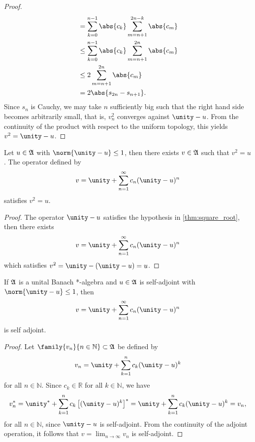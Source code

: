 \begin{proof}
\begin{align*}
                                    &= \sum_{k = 0}^{n-1} \abs{c_k} \sum_{m = n+1}^{2n - k} \abs{c_m}\\
                                    &\leq \sum_{k = 0}^{n-1} \abs{c_k} \sum_{m = n+1}^{2n} \abs{c_m}\\
                                    &\leq 2 \sum_{m = n+1}^{2n} \abs{c_m}\\
                                    &= 2 \abs{s_{2n} - s_{n+1}}.
    \end{align*}
    Since \(s_n\) is Cauchy, we may take \(n\) sufficiently big such that the right hand side becomes arbitrarily small, that is, \(v_n^2\) converges against \(\unity - u\). From the continuity of the product with respect to the uniform topology, this yields \(v^2 = \unity - u\).
\end{proof}
\begin{corollary}
    Let \(u \in \mathfrak{A}\) with \(\norm{\unity - u} \leq 1\), then there exists \(v \in \mathfrak{A}\) such that \(v^2 = u\). The operator defined by
    \begin{equation*}
        v = \unity + \sum_{n=1}^\infty c_n (\unity - u)^n
    \end{equation*}
    satisfies \(v^2 = u\).
\end{corollary}
\begin{proof}
    The operator \(\unity - u\) satisfies the hypothesis in \cref{thm:square_root}, then there exists
    \begin{equation*}
        v = \unity + \sum_{n = 1}^\infty c_n (\unity - u)^n
    \end{equation*}
    which satisfies \(v^2 = \unity - (\unity - u) = u\).
\end{proof}
\begin{corollary}
    If \(\mathfrak{A}\) is a unital Banach *-algebra and \(u \in \mathfrak{A}\) is self-adjoint with \(\norm{\unity - u} \leq 1\), then
    \begin{equation*}
        v = \unity + \sum_{n = 1}^{\infty}c_n(\unity - u)^n
    \end{equation*}
    is self adjoint.
\end{corollary}
\begin{proof}
    Let \(\family{v_n}{n \in \mathbb{N}} \subset \algebra{A}\) be defined by
    \begin{equation*}
        v_n = \unity + \sum_{k = 1}^n c_k (\unity - u)^k
    \end{equation*}
    for all \(n \in \mathbb{N}\). Since \(c_k \in \mathbb{R}\) for all \(k \in \mathbb{N}\), we have
    \begin{equation*}
        v_n^* = \unity^* + \sum_{k=1}^n c_k\left[(\unity - u)^k\right]^* = \unity + \sum_{k=1}^n c_k (\unity - u)^k = v_n,
    \end{equation*}
    for all \(n \in \mathbb{N}\), since \(\unity - u\) is self-adjoint. From the continuity of the adjoint operation, it follows that \(\displaystyle v = \lim_{n\to\infty} v_n\) is self-adjoint.
\end{proof}

